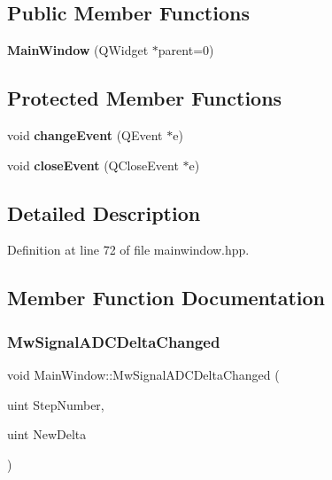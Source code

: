 \subsection*{Public Member Functions}
\begin{DoxyCompactItemize}
\item 
\mbox{\label{class_main_window_a8b244be8b7b7db1b08de2a2acb9409db}} 
{\bfseries Main\+Window} (Q\+Widget $\ast$parent=0)
\end{DoxyCompactItemize}
\subsection*{Protected Member Functions}
\begin{DoxyCompactItemize}
\item 
\mbox{\label{class_main_window_af4ca5d0d3d18ddcb7d54b6596bbf4797}} 
void {\bfseries change\+Event} (Q\+Event $\ast$e)
\item 
\mbox{\label{class_main_window_a8a5bf36f9544ed3ec3a9eea9b7154564}} 
void {\bfseries close\+Event} (Q\+Close\+Event $\ast$e)
\end{DoxyCompactItemize}


\subsection{Detailed Description}


Definition at line 72 of file mainwindow.\+hpp.



\subsection{Member Function Documentation}
\mbox{\label{class_main_window_a37ea64ccb9b5bcf9bb976602d42aadfa}} 
\subsubsection{\texorpdfstring{Mw\+Signal\+A\+D\+C\+Delta\+Changed}{MwSignalADCDeltaChanged}}
{\footnotesize\ttfamily void Main\+Window\+::\+Mw\+Signal\+A\+D\+C\+Delta\+Changed (\begin{DoxyParamCaption}\item[{uint}]{Step\+Number,  }\item[{uint}]{New\+Delta }\end{DoxyParamCaption})\hspace{0.3cm}{\ttfamily [signal]}}



